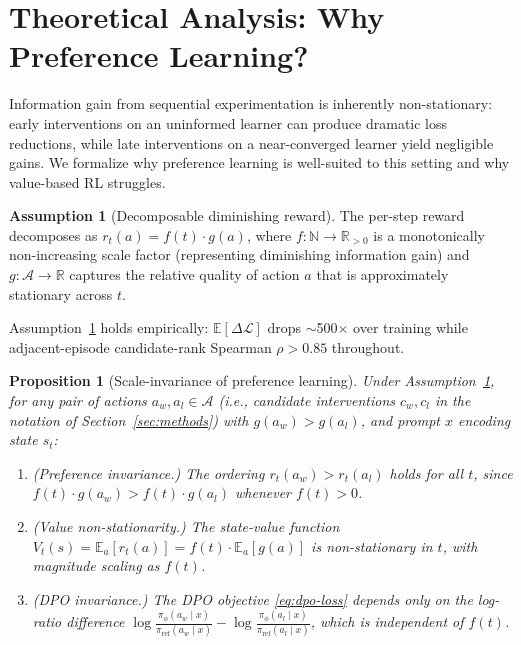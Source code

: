 \documentclass{article}
\theoremstyle{plain}
\newtheorem{proposition}[theorem]{Proposition}
\theoremstyle{definition}
\newtheorem{assumption}[theorem]{Assumption}
\theoremstyle{remark}
\begin{document}
\section{Theoretical Analysis: Why Preference Learning?}
\label{sec:theory}

Information gain from sequential experimentation is inherently non-stationary: early interventions on an uninformed learner can produce dramatic loss reductions, while late interventions on a near-converged learner yield negligible gains. We formalize why preference learning is well-suited to this setting and why value-based RL struggles.

\begin{assumption}[Decomposable diminishing reward]
\label{ass:diminish}
The per-step reward decomposes as $r_t(a) = f(t) \cdot g(a)$, where $f : \mathbb{N} \to \mathbb{R}_{>0}$ is a monotonically non-increasing scale factor (representing diminishing information gain) and $g : \mathcal{A} \to \mathbb{R}$ captures the relative quality of action $a$ that is approximately stationary across $t$.
\end{assumption}

Assumption~\ref{ass:diminish} holds empirically: $\mathbb{E}[\Delta\mathcal{L}]$ drops $\sim$500$\times$ over training while adjacent-episode candidate-rank Spearman $\rho > 0.85$ throughout.
\begin{proposition}[Scale-invariance of preference learning]
\label{prop:scale-invariance}
Under Assumption~\ref{ass:diminish}, for any pair of actions $a_w, a_l \in \mathcal{A}$ (i.e., candidate interventions $c_w, c_l$ in the notation of Section~\ref{sec:methods}) with $g(a_w) > g(a_l)$, and prompt $x$ encoding state $s_t$:
\begin{enumerate}[leftmargin=1.5em,topsep=0.2em,itemsep=0.1em]
\item \emph{(Preference invariance.)} The ordering $r_t(a_w) > r_t(a_l)$ holds for all $t$, since $f(t) \cdot g(a_w) > f(t) \cdot g(a_l)$ whenever $f(t) > 0$.
\item \emph{(Value non-stationarity.)} The state-value function $V_t(s) = \mathbb{E}_a[r_t(a)] = f(t) \cdot \mathbb{E}_a[g(a)]$ is non-stationary in $t$, with magnitude scaling as $f(t)$.
\item \emph{(DPO invariance.)} The DPO objective \eqref{eq:dpo-loss} depends only on the log-ratio difference $\log\tfrac{\pi_\phi(a_w \mid x)}{\pi_\text{ref}(a_w \mid x)} - \log\tfrac{\pi_\phi(a_l \mid x)}{\pi_\text{ref}(a_l \mid x)}$, which is independent of $f(t)$.
\end{enumerate}
\end{proposition}
\end{document}
